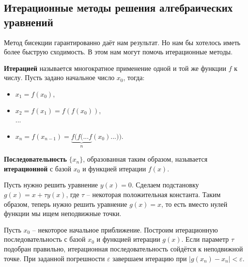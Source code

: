 \documentclass[../main.tex]{subfile}
\begin{document}
\begin{example}
\end{example}


\subsection{Итерационные методы решения алгебраических уравнений}

Метод бисекции гарантированно даёт нам результат. Но нам бы хотелось иметь
более быструю сходимость. В этом нам могут помочь итерационные методы.

\begin{define}
	\textbf{Итерацией} называется многократное применение одной и той же
	функции $f$ к числу. Пусть задано начальное число $x_0$, тогда:
	\begin{itemize}[noitemsep, nolistsep]
		\item $x_1=f(x_0)$,
		\item $x_2=f(x_1)=f(f(x_0))$,\\
		...
		\item $x_n=f(x_{n-1})=\underset{n}{\underbrace{f(f(...f}}(x_0)...))$.
	\end{itemize}

	\textbf{Последовательность} $\{x_n\}$, образованная таким образом,
	называется \textbf{итерационной} с базой $x_0$ и функцией итерации $f(x)$.
\end{define}

\begin{algorithm}
	Пусть нужно решить уравнение $y(x)=0$. Сделаем подстановку
	$g(x)=x+\tau y(x)$, где $\tau$ -- некоторая положительная константа.
	Таким образом, теперь нужно решить уравнение $g(x)=x$, то есть вместо
	нулей функции мы ищем неподвижные точки.

	Пусть $x_0$ -- некоторое начальное приближение. Построим итерационную
	последовательность с базой $x_0$ и функцией итерации $g(x)$. Если
	параметр $\tau$ подобран правильно, итерационная последовательность
	сойдётся к неподвижной точке. При заданной погрешности $\varepsilon$
	завершаем итерацию при $|g(x_n)-x_n|<\varepsilon$.
\end{algorithm}
\end{document}
